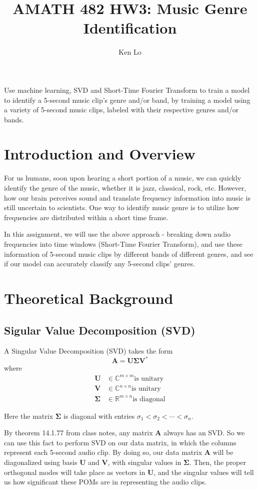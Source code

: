 \documentclass[12pt, a4paper]{article}
\begin{document}
\author{Ken Lo}
\title{AMATH 482 HW3: Music Genre Identification}
\maketitle

\abstract
Use machine learning, SVD and Short-Time Fourier Transform to train a model to identify a 5-second music clip's genre and/or band, by training a model using a variety of 5-second music clips, labeled with their respective genres and/or bands.


\section{Introduction and Overview}
For us humans, soon upon hearing a short portion of a music, we can quickly identify the genre of the music, whether it is jazz, classical, rock, etc. However, how our brain perceives sound and translate frequency information into music is still uncertain to scientists. One way to identify music genre is to utilize how frequencies are distributed within a short time frame.

In this assignment, we will use the above approach - breaking down audio frequencies into time windows (Short-Time Fourier Transform), and use these information of 5-second music clips by different bands of different genres, and see if our model can accurately classify any 5-second clips' genres.

\section{Theoretical Background}
\subsection{Sigular Value Decomposition (SVD)}
A Singular Value Decomposition (SVD) takes the form
$$\mathbf{A} = \mathbf{U\Sigma V^*}$$
where
\begin{align*}
\mathbf{U} &\in \mathbb{C}^{m\times m} \text{is unitary}\\
\mathbf{V} &\in \mathbb{C}^{n \times n} \text{is unitary}\\
\mathbf{\Sigma} &\in \mathbb{R}^{m \times n} \text{is diagonal}
\end{align*}

Here the matrix $\mathbf{\Sigma}$ is diagonal with entries $\sigma_1 < \sigma_2 < \cdots < \sigma_n$.

By theorem 14.1.77 from class notes, any matrix $\mathbf{A}$ always has an SVD. So we can use this fact to perform SVD on our data matrix, in which the columns represent each 5-second audio clip. By doing so, our data matrix $\mathbf{A}$ will be diagonalized using basis $\mathbf{U}$ and $\mathbf{V}$, with singular values in $\mathbf{\Sigma}$. Then, the proper orthogonal modes will take place as vectors in $\mathbf{U}$, and the singular values will tell us how significant these POMs are in representing the audio clips. 
\end{document}
